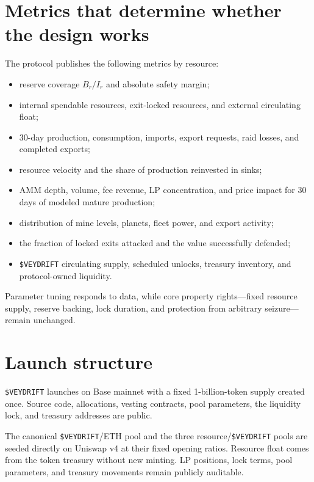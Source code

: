 \documentclass[11pt]{article}
\newcommand{\token}[1]{\texttt{\$#1}}
\begin{document}
\section{Metrics that determine whether the design works}

The protocol publishes the following metrics by resource:

\begin{itemize}
  \item reserve coverage $B_r/I_r$ and absolute safety margin;
  \item internal spendable resources, exit-locked resources, and external circulating float;
  \item 30-day production, consumption, imports, export requests, raid losses, and completed exports;
  \item resource velocity and the share of production reinvested in sinks;
  \item AMM depth, volume, fee revenue, LP concentration, and price impact for 30 days of modeled mature production;
  \item distribution of mine levels, planets, fleet power, and export activity;
  \item the fraction of locked exits attacked and the value successfully defended;
  \item \token{VEYDRIFT} circulating supply, scheduled unlocks, treasury inventory, and protocol-owned liquidity.
\end{itemize}

Parameter tuning responds to data, while core property rights---fixed resource supply, reserve backing, lock duration, and protection from arbitrary seizure---remain unchanged.

\section{Launch structure}

\token{VEYDRIFT} launches on Base mainnet with a fixed 1-billion-token supply created once. Source code, allocations, vesting contracts, pool parameters, the liquidity lock, and treasury addresses are public.

The canonical \token{VEYDRIFT}/ETH pool and the three resource/\token{VEYDRIFT} pools are seeded directly on Uniswap v4 at their fixed opening ratios. Resource float comes from the token treasury without new minting. LP positions, lock terms, pool parameters, and treasury movements remain publicly auditable.
\end{document}
